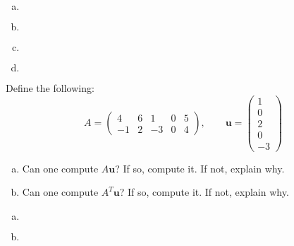 \documentclass[11pt,letterpaper]{article}
\begin{document}
\sol 
\begin{enumerate}[(a)]
\item 
	\[
	
	\]

\item 
	\[
	
	\]

\item 
	\[
	
	\]

\item 
	\[
	
	\]
\end{enumerate}



\newpage



 Define the following:
	\[
	A= \begin{pmatrix} 4 & 6 & 1 & 0 & 5 \\ -1 & 2 & -3 & 0 & 4 \end{pmatrix}, \qquad
	\mathbf{u}= \begin{pmatrix} 1 \\ 0 \\ 2 \\ 0 \\ -3 \end{pmatrix}
	\]

\begin{enumerate}[(a)]
\item Can one compute $A\mathbf{u}$? If so, compute it. If not, explain why. 
\item Can one compute $A^T\mathbf{u}$? If so, compute it. If not, explain why. 
\end{enumerate} \pspace

\sol 
\begin{enumerate}[(a)]
\item 
	\[
	
	\]

\item 
	\[
	
	\]
\end{enumerate}
\end{document}
